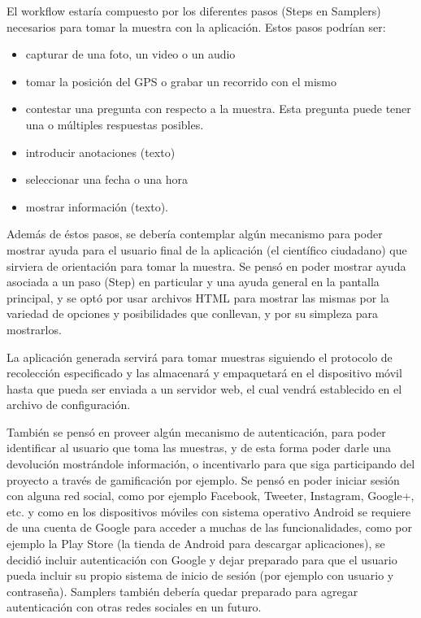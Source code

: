 El workflow estaría compuesto por los diferentes pasos (Steps en Samplers) necesarios para tomar la muestra con la aplicación. Estos pasos podrían ser:
\begin{itemize}
\item capturar de una foto, un video o un audio
\item tomar la posición del GPS o grabar un recorrido con el mismo
\item contestar una pregunta con respecto a la muestra. Esta pregunta puede tener una o múltiples respuestas posibles.
\item introducir anotaciones (texto)
\item seleccionar una fecha o una hora
\item mostrar información (texto).
\end{itemize}

Además de éstos pasos, se debería contemplar algún mecanismo para poder mostrar ayuda para el usuario final de la aplicación (el científico ciudadano) que sirviera de orientación para tomar la muestra. Se pensó en poder mostrar ayuda asociada a un paso (Step) en particular y una ayuda general en la pantalla principal, y se optó por usar archivos HTML para mostrar las mismas por la variedad de opciones y posibilidades que conllevan, y por su simpleza para mostrarlos.

La aplicación generada servirá para tomar muestras siguiendo el protocolo de recolección especificado y las almacenará y empaquetará en el dispositivo móvil hasta que pueda ser enviada a un servidor web, el cual vendrá establecido en el archivo de configuración.

También se pensó en proveer algún mecanismo de autenticación, para poder identificar al usuario que toma las muestras, y de esta forma poder darle una devolución mostrándole información, o incentivarlo para que siga participando del proyecto a través de gamificación por ejemplo.
Se pensó en poder iniciar sesión con alguna red social, como por ejemplo Facebook, Tweeter, Instagram, Google+, etc. y como en los dispositivos móviles con sistema operativo Android se requiere de una cuenta de Google para acceder a muchas de las funcionalidades, como por ejemplo la Play Store (la tienda de Android para descargar aplicaciones), se decidió incluir autenticación con Google y dejar preparado para que el usuario pueda incluir su propio sistema de inicio de sesión (por ejemplo con usuario y contraseña). Samplers también debería quedar preparado para agregar autenticación con otras redes sociales en un futuro.

